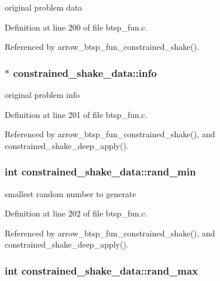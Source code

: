 original problem data 

Definition at line 200 of file btsp\_\-fun.c.

Referenced by arrow\_\-btsp\_\-fun\_\-constrained\_\-shake().\hypertarget{structconstrained__shake__data_d9b2d3116046f50437d023ac9bfcd51f}{
\subsubsection{$\ast$ {\bf constrained\_\-shake\_\-data::info}}}
\label{structconstrained__shake__data_d9b2d3116046f50437d023ac9bfcd51f}


original problem info 

Definition at line 201 of file btsp\_\-fun.c.

Referenced by arrow\_\-btsp\_\-fun\_\-constrained\_\-shake(), and constrained\_\-shake\_\-deep\_\-apply().\hypertarget{structconstrained__shake__data_76a13ad58e4ad8c74270ce8b05765ff9}{
\subsubsection{\setlength{\rightskip}{0pt plus 5cm}int {\bf constrained\_\-shake\_\-data::rand\_\-min}}}
\label{structconstrained__shake__data_76a13ad58e4ad8c74270ce8b05765ff9}


smallest random number to generate 

Definition at line 202 of file btsp\_\-fun.c.

Referenced by arrow\_\-btsp\_\-fun\_\-constrained\_\-shake(), and constrained\_\-shake\_\-deep\_\-apply().\hypertarget{structconstrained__shake__data_39972f2868c566a04f200957d9ad0c3f}{
\subsubsection{\setlength{\rightskip}{0pt plus 5cm}int {\bf constrained\_\-shake\_\-data::rand\_\-max}}}
\label{structconstrained__shake__data_39972f2868c566a04f200957d9ad0c3f}


